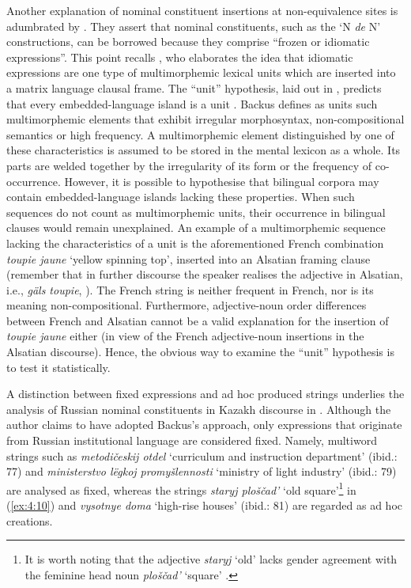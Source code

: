 \begin{sloppypar}
Another explanation of nominal constituent insertions at non-equivalence sites is adumbrated by \citet[215]{poplack-meechan-1995}. They assert that nominal constituents, such as the `N \textit{de} N' constructions, can be borrowed because they comprise ``frozen or idiomatic expressions''. This point recalls \citet{backus-two-1996,backus-evidence-1999,backus-units-2003}, who elaborates the idea that idiomatic expressions are one type of multimorphemic lexical units which are inserted into a matrix language clausal frame. The ``unit'' hypothesis, laid out in , predicts that every embedded-language island is a unit \citep[cf.][91]{backus-units-2003}. Backus defines as units such multimorphemic elements that exhibit irregular morphosyntax, non-compositional semantics or high frequency. A multimorphemic element distinguished by one of these characteristics is assumed to be stored in the mental lexicon as a whole. Its parts are welded together by the irregularity of its form or the frequency of co-occurrence. However, it is possible to hypothesise that bilingual corpora may contain embedded-language islands lacking these properties. When such sequences do not count as multimorphemic units, their occurrence in bilingual clauses would remain unexplained. An example of a multimorphemic sequence lacking the characteristics of a unit is the aforementioned French combination \textit{toupie jaune} `yellow spinning top', inserted into an Alsatian framing clause (remember that in further discourse the speaker realises the adjective in Alsatian, i.e., \textit{gäls toupie}, \citealt[133]{gardner-chloros-1991}). The French string is neither frequent in French, nor is its meaning non-compositional. Furthermore, adjective-noun order differences between French and Alsatian cannot be a valid explanation for the insertion of \textit{toupie jaune} either (in view of the French adjective-noun insertions in the Alsatian discourse). Hence, the obvious way to examine the ``unit'' hypothesis is to test it statistically.
\end{sloppypar}

A distinction between fixed expressions and ad hoc produced strings underlies the analysis of Russian nominal constituents in Kazakh discourse in \citet[77--88]{muhamedowa-untersuchung-2006}. Although the author claims to have adopted Backus's approach, only expressions that originate from Russian institutional language are considered fixed. Namely, multiword strings such as \textit{metodičeskij otdel} `curriculum and instruction department' (ibid.: 77) and  \textit{ministerstvo lëgkoj promyšlennosti} `ministry of light industry' (ibid.: 79) are analysed as fixed, whereas the strings \textit{staryj ploščad'} `old square'\footnote{It is worth noting that the adjective \textit{staryj} `old' lacks gender agreement with the feminine head noun \textit{ploščad'} `square' \citep[82]{muhamedowa-untersuchung-2006}.} in (\ref{ex:4:10}) and \textit{vysotnye doma} `high-rise houses' (ibid.: 81) are regarded as ad hoc creations. 

